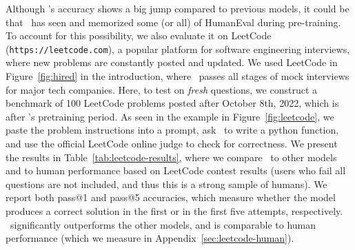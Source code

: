 Although {\DV}'s accuracy shows a big jump compared to previous models, it could be that \DV\ has seen and memorized some (or all) of HumanEval during pre-training. To account for this possibility, we also evaluate it on LeetCode (\texttt{https://leetcode.com}), a popular platform for software engineering interviews, where new problems are constantly posted and updated.
We used LeetCode in Figure~\ref{fig:hired} in the introduction, where \DV\ passes all stages of mock interviews for major tech companies.
Here, to test on \emph{fresh} questions, we construct a benchmark of 100 LeetCode problems posted after October 8th, 2022, which is after \DV's pretraining period.
As seen in the example in Figure~\ref{fig:leetcode}, we paste the problem instructions into a prompt, ask \DV\ to write a python function, and use the official LeetCode online judge to check for correctness.
We present the results in Table~\ref{tab:leetcode-results}, where we compare \DV\ to other models and to human performance based on LeetCode contest results (users who fail all questions are not included, and thus this is a strong sample of humans).
We report both pass@1 and pass@5 accuracies, which measure whether the model produces a correct solution in the first or in the first five attempts, respectively. 
\DV\ significantly outperforms the other models, and is comparable to human performance (which we measure in Appendix~\ref{sec:leetcode-human}).

